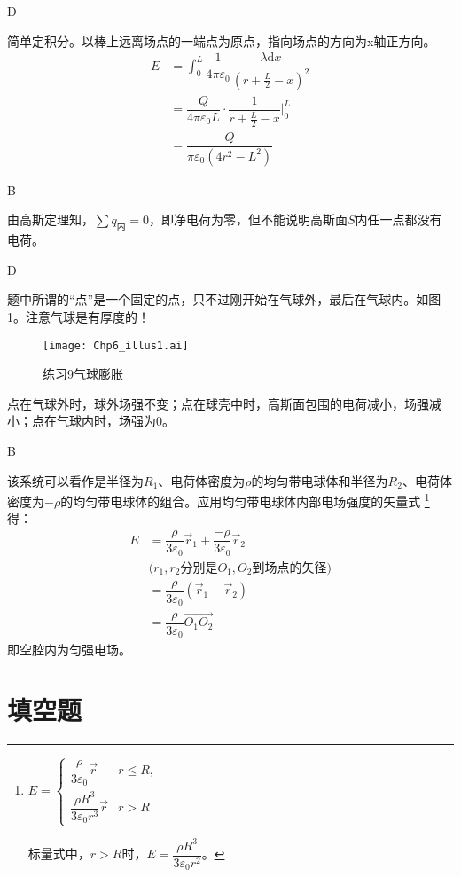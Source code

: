 \documentclass[b5paper,opensource]{./template/qyxf-book}
\newcommand{\di}[1]{\mathrm{d}#1}
\begin{document}
D

\solve
简单定积分。以棒上远离场点的一端点为原点，指向场点的方向为x轴正方向。
\begin{align*}
	E&=\int_{0}^{L}\dfrac{1}{4\pi \varepsilon_0}\dfrac{\lambda\di{x}}{{(r+\frac{L}{2}-x)}^2}\\
	&=\dfrac{Q}{4\pi \varepsilon_0 L}\cdot \dfrac{1}{{r+\frac{L}{2}-x}}\bigg|_0^L\\
	&=\dfrac{Q}{\pi \varepsilon_0(4r^2-L^2)}
\end{align*}

B

\solve
由高斯定理知，$\sum q_{\text{内}}=0$，即净电荷为零，但不能说明高斯面$S$内任一点都没有电荷。

D

\solve
题中所谓的“点”是一个固定的点，只不过刚开始在气球外，最后在气球内。如图1。注意气球是有厚度的！
\begin{figure}[!h]
	\centering
	\texttt{[image: Chp6\_illus1.ai]}
	\caption{练习9\quad 气球膨胀}
\end{figure}
点在气球外时，球外场强不变；点在球壳中时，高斯面包围的电荷减小，场强减小；点在气球内时，场强为0。

B

\solve
该系统可以看作是半径为$R_1$、电荷体密度为$\rho$的均匀带电球体和半径为$R_2$、电荷体密度为$-\rho$的均匀带电球体的组合。应用均匀带电球体内部电场强度的矢量式
\footnote{
	$E=
	\begin{cases}
	\dfrac{\rho}{3\varepsilon_0}\vec{r} & r\leqslant R,\\
	\dfrac{\rho R^3}{3\varepsilon_0 r^3}\vec{r} & r > R
	\end{cases}$

	标量式中，$r>R$时，$E=\dfrac{\rho R^3}{3\varepsilon_0 r^2}$。
}得：
\begin{align*}
	E&=\dfrac{\rho}{3\varepsilon_0}\vec{r}_1+\dfrac{-\rho}{3\varepsilon_0}\vec{r}_2\\
	&\text{($r_1,r_2$分别是$O_1,O_2$到场点的矢径)}\\
	&=\dfrac{\rho}{3\varepsilon_0}(\vec{r}_1-\vec{r}_2)\\
	&=\dfrac{\rho}{3\varepsilon_0}\overrightarrow{O_1O_2}
\end{align*}
即空腔内为匀强电场。

\section{填空题}
\end{document}
